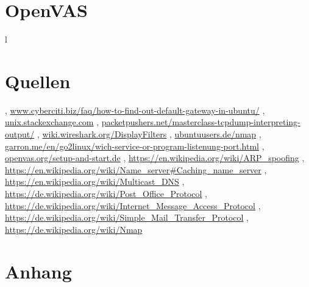 \documentclass[12pt]{article}
\theoremstyle{plain}
\begin{document}
\section{OpenVAS}

l
\newline
\section{Quellen}
\begin{thebibliography}{50}
\bibitem  [Cyberciti], \url{www.cyberciti.biz/faq/how-to-find-out-default-gateway-in-ubuntu/}
\bibitem [Stackexchange] , \url{unix.stackexchange.com}
\bibitem [Tcpdump], \url{packetpushers.net/masterclass-tcpdump-interpreting-output/}
\bibitem [Wireshark], \url{wiki.wireshark.org/DisplayFilters}
\bibitem [Nmap 1], \url{ubuntuusers.de/nmap}
\bibitem [Nmap 2], \url{garron.me/en/go2linux/wich-service-or-program-listenung-port.html}
\bibitem [OpenVAS], \url{openvas.org/setup-and-start.de}
, \url{https://en.wikipedia.org/wiki/ARP_spoofing}
\bibitem [DNS], \url{https://en.wikipedia.org/wiki/Name_server#Caching_name_server}
\bibitem [DNS 2], \url{https://en.wikipedia.org/wiki/Multicast_DNS}
\bibitem [POP], \url{https://de.wikipedia.org/wiki/Post_Office_Protocol}
\bibitem [IMAP], \url{https://de.wikipedia.org/wiki/Internet_Message_Access_Protocol}
\bibitem [SMTP], \url{https://de.wikipedia.org/wiki/Simple_Mail_Transfer_Protocol}
\bibitem [Nmap 3], \url{https://de.wikipedia.org/wiki/Nmap}	
\end{thebibliography}
\section{Anhang}
\end{document}
